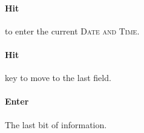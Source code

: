\paragraph{Hit} {\faKeyboardO}  to enter the current \textsc{Date and Time}.\\


\paragraph{Hit} {\faKeyboardO}  key to move to the last field.\\

\paragraph{Enter} The last bit of information.\\




